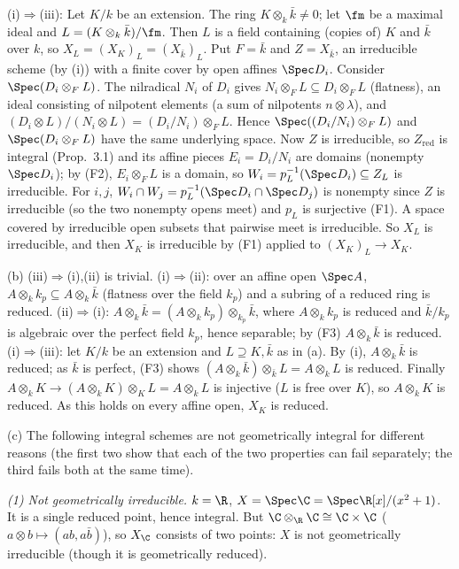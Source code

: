 \documentclass[11pt]{article}
\begin{document}
(i)$\Rightarrow$(iii): Let $K/k$ be an extension. The ring $K\otimes_k\bar k\ne0$; let $\fm$ be a maximal ideal and $L=(K\otimes_k\bar k)/\fm$. Then $L$ is a field containing (copies of) $K$ and $\bar k$ over $k$, so $X_L=(X_K)_L=(X_{\bar k})_L$. Put $F=\bar k$ and $Z=X_{\bar k}$, an irreducible scheme (by (i)) with a finite cover by open affines $\Spec D_i$. Consider $\Spec(D_i\otimes_FL)$. The nilradical $N_i$ of $D_i$ gives $N_i\otimes_FL\subseteq D_i\otimes_FL$ (flatness), an ideal consisting of nilpotent elements (a sum of nilpotents $n\otimes\lambda$), and $(D_i\otimes L)/(N_i\otimes L)=(D_i/N_i)\otimes_FL$. Hence $\Spec((D_i/N_i)\otimes_FL)$ and $\Spec(D_i\otimes_FL)$ have the same underlying space. Now $Z$ is irreducible, so $Z_{\mathrm{red}}$ is integral (Prop.~3.1) and its affine pieces $E_i=D_i/N_i$ are domains (nonempty $\Spec D_i$); by (F2), $E_i\otimes_FL$ is a domain, so $W_i=p_L^{-1}(\Spec D_i)\subseteq Z_L$ is irreducible. For $i,j$, $W_i\cap W_j=p_L^{-1}(\Spec D_i\cap\Spec D_j)$ is nonempty since $Z$ is irreducible (so the two nonempty opens meet) and $p_L$ is surjective (F1). A space covered by irreducible open subsets that pairwise meet is irreducible. So $X_L$ is irreducible, and then $X_K$ is irreducible by (F1) applied to $(X_K)_L\to X_K$.

(b) (iii)$\Rightarrow$(i),(ii) is trivial. (i)$\Rightarrow$(ii): over an affine open $\Spec A$, $A\otimes_kk_p\subseteq A\otimes_k\bar k$ (flatness over the field $k_p$) and a subring of a reduced ring is reduced. (ii)$\Rightarrow$(i): $A\otimes_k\bar k=(A\otimes_kk_p)\otimes_{k_p}\bar k$, where $A\otimes_kk_p$ is reduced and $\bar k/k_p$ is algebraic over the perfect field $k_p$, hence separable; by (F3) $A\otimes_k\bar k$ is reduced. (i)$\Rightarrow$(iii): let $K/k$ be an extension and $L\supseteq K,\bar k$ as in (a). By (i), $A\otimes_k\bar k$ is reduced; as $\bar k$ is perfect, (F3) shows $(A\otimes_k\bar k)\otimes_{\bar k}L=A\otimes_kL$ is reduced. Finally $A\otimes_kK\to(A\otimes_kK)\otimes_KL=A\otimes_kL$ is injective ($L$ is free over $K$), so $A\otimes_kK$ is reduced. As this holds on every affine open, $X_K$ is reduced.

(c) The following integral schemes are not geometrically integral for different reasons (the first two show that each of the two properties can fail separately; the third fails both at the same time).

\emph{(1) Not geometrically irreducible.} $k=\R$, $X=\Spec\C=\Spec\R[x]/(x^2+1)$. It is a single reduced point, hence integral. But $\C\otimes_\R\C\cong\C\times\C$ ($a\otimes b\mapsto(ab,a\bar b)$), so $X_\C$ consists of two points: $X$ is not geometrically irreducible (though it is geometrically reduced).
\end{document}
